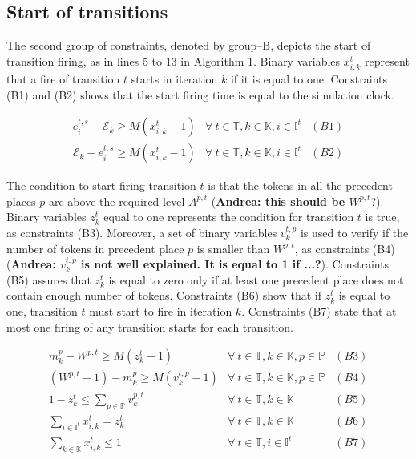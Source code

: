 \documentclass[suppldata]{interact}
\theoremstyle{plain}
\theoremstyle{definition}
\theoremstyle{remark}
\begin{document}
\subsection{Start of transitions} \label{sec:MPR_start_Firing}

The second group of constraints, denoted by group--B, depicts the start of transition firing, as in lines 5 to 13 in Algorithm 1. Binary variables $x^{t}_{i,k}$ represent that a fire of transition $t$ starts in iteration $k$ if it is equal to one. Constraints (B1) and (B2) shows that the start firing time is equal to the simulation clock.

\begin{eqnarray}
	e^{t,s}_i-\mathcal{E}_{k} \ge M(x^{t}_{i,k}-1)& \forall\ t\in \mathbb{T},k\in \mathbb{K},i\in \mathbb{I}^{t}&(B1)\nonumber\\
	\mathcal{E}_{k} -e^{t,s}_i\ge M(x^{t}_{i,k}-1)&\forall\ t\in \mathbb{T},k\in \mathbb{K},i\in \mathbb{I}^{t}&(B2)\nonumber
\end{eqnarray}

The condition to start firing transition $t$ is that the tokens in all the precedent places $p$ are above the required level $A^{p,t}$ (\textbf{Andrea: this should be $W^{p,t}$}?). Binary variables $z^{t}_{k}$ equal to one represents the condition for transition $t$ is true, as constraints (B3). Moreover, a set of binary variables $v^{t,p}_k$ is used to verify if the number of tokens in precedent place $p$ is smaller than $W^{p,t}$, as constraints (B4) (\textbf{Andrea: $v^{t,p}_k$ is not well explained. It is equal to 1 if ...?}). Constraints (B5) assures that $z^{t}_k$ is equal to zero only if at least one precedent place does not contain enough number of tokens. Constraints (B6) show that if $z^{t}_k$ is equal to one, transition $t$ must start to fire in iteration $k$. Constraints (B7) state that at most one firing of any transition starts for each transition.

\begin{eqnarray}
	m^p_k - W^{p,t} \ge M(z^{t}_{k}-1)&\forall\ t\in \mathbb{T},k\in \mathbb{K},p\in \mathbb{P}&(B3)\nonumber\\
	(W^{p,t}-1) - m^p_k \ge M(v^{t,p}_k-1) & \forall\ t\in \mathbb{T},k\in \mathbb{K},p\in \mathbb{P} &(B4)\nonumber\\
	1 - z^{t}_{k} \le \sum_{p\in \mathbb{P}} v^{p,t}_k&\forall\ t\in \mathbb{T},k\in \mathbb{K}&(B5)\nonumber\\
	\sum_{i\in \mathbb{I}^{t}} x^{t}_{i,k} = z^{t}_k&\forall\ t\in \mathbb{T},k\in \mathbb{K}&(B6)\nonumber\\
	\sum_{k\in \mathbb{K}} x^{t}_{i,k} \le 1& \forall\ t\in \mathbb{T},i\in \mathbb{I}^{t}&(B7)\nonumber
\end{eqnarray}
\end{document}
